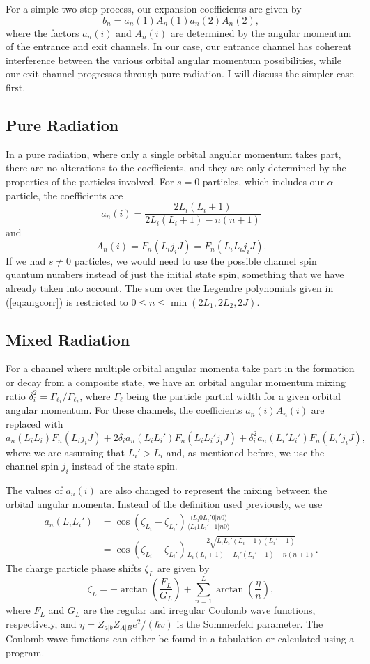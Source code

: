 \documentclass[10pt]{amsart}
\numberwithin{equation}{subsection}
\begin{document}
For a simple two-step process, our expansion coefficients are given by
\[
    b_n = a_n(1)A_n(1)a_n(2)A_n(2),
\]
where the factors $a_n(i)$ and $A_n(i)$ are determined by the angular momentum
of the entrance and exit channels. In our case, our entrance channel has
coherent interference between the various orbital angular momentum
possibilities, while our exit channel progresses through pure radiation. I will
discuss the simpler case first.


\subsection{Pure Radiation}

In a pure radiation, where only a single orbital angular momentum takes part,
there are no alterations to the coefficients, and they are only determined by
the properties of the particles involved. For $s = 0$ particles, which includes
our $\alpha$ particle, the coefficients are
\[
    a_n(i) = \frac{2L_i(L_i + 1)}{2L_i(L_i + 1) - n(n + 1)}
\]
and
\[
    A_n(i) = F_n(L_ij_iJ) = F_n(L_iL_ij_iJ).
\]
If we had $s \neq 0$ particles, we would need to use the possible channel spin
quantum numbers instead of just the initial state spin, something that we have
already taken into account. The sum over the Legendre polynomials given in
(\ref{eq:angcorr}) is restricted to $0 \leq n \leq \min(2L_1, 2L_2, 2J)$.


\subsection{Mixed Radiation}

For a channel where multiple orbital angular momenta take part in the formation
or decay from a composite state, we have an orbital angular momentum mixing
ratio $\delta_i^2 = \Gamma_{\ell_1} / \Gamma_{\ell_2}$, where $\Gamma_{\ell}$
being the particle partial width for a given orbital angular momentum. For
these channels, the coefficients $a_n(i)A_n(i)$ are replaced with
\[
    a_n(L_iL_i)F_n(L_ij_iJ) + 2\delta_ia_n(L_iL_i')F_n(L_iL_i'j_iJ) +
        \delta_i^2a_n(L_i'L_i')F_n(L_i'j_iJ),
\]
where we are assuming that $L_i' > L_i$ and, as mentioned before, we use the
channel spin $j_i$ instead of the state spin.

The values of $a_n(i)$ are also changed to represent the mixing between the
orbital angular momenta. Instead of the definition used previously, we use
\begin{align*}
    a_n(L_iL_i') &= \cos(\zeta_{L_i} - \zeta_{L_i'})
        \frac{\langle L_i0L_i'0|n0\rangle}{\langle L_i1L_i'{-1}|n0\rangle} \\
    &= \cos(\zeta_{L_i} - \zeta_{L_i'})
        \frac{2\sqrt{L_iL_i'(L_i + 1)(L_i' + 1)}}
        {L_i(L_i + 1) + L_i'(L_i' + 1) - n(n + 1)}.
\end{align*}
The charge particle phase shifts $\zeta_L$ are given by
\[
    \zeta_L = {-\arctan}\left(\frac{F_L}{G_L}\right) +
        \sum_{n = 1}^L\arctan\left(\frac{\eta}{n}\right),
\]
where $F_L$ and $G_L$ are the regular and irregular Coulomb wave functions,
respectively, and $\eta = Z_{a|b}Z_{A|B}e^2/(\hbar v)$ is the Sommerfeld
parameter. The Coulomb wave functions can either be found in a tabulation or
calculated using a program.
\end{document}

